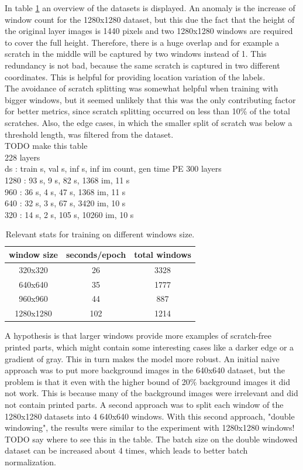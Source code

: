  In table \ref{win_size_training} an overview of the datasets is displayed. An anomaly is the increase of window count for the 1280x1280 dataset, but this due the fact that the height of the original layer images is 1440 pixels and two 1280x1280 windows are required to cover the full height. Therefore, there is a huge overlap and for example a scratch in the middle will be captured by two windows instead of 1. This redundancy is not bad, because the same scratch is captured in two different coordinates. This is helpful for providing location variation of the labels.  \\
The avoidance of scratch splitting was somewhat helpful when training with bigger windows, but it seemed unlikely that this was the only contributing factor for better metrics, since scratch splitting occurred on less than 10\% of the total scratches. Also, the edge cases, in which the smaller split of scratch was below a threshold length, was filtered from the dataset. \\

TODO make this table \\
228 layers \\
ds : train s, val s, inf s, inf im count, gen time PE 300 layers \\
1280 : 93 s, 9 s, 82 s, 1368 im, 11 s \\
960 : 36 s, 4 s, 47 s, 1368 im, 11 s \\
640 : 32 s, 3 s, 67 s, 3420 im, 10 s \\
320 : 14 s, 2 s, 105 s, 10260 im, 10 s \\

\begin{table}
\centering
\begin{tabular}{ ||c|c|c||}
\hline
window size & seconds/epoch & total windows\\ [0.5ex]
\hline\hline
320x320 & 26 & 3328 \\
640x640 & 35 & 1777 \\
960x960 & 44 & 887 \\
1280x1280 & 102 & 1214 \\
\hline
\end{tabular}
\label{win_size_training}
\caption{Relevant stats for training on different windows size.}
\end{table}

 A hypothesis is that larger windows provide more examples of scratch-free printed parts, which might contain some interesting cases like a darker edge or a gradient of gray. This in turn makes the model more robust. An initial naive approach was to put more background images in the 640x640 dataset, but the problem is that it even with the higher bound of 20\% background images it did not work. This is because many of the background images were irrelevant and did not contain printed parts. A second approach was to split each window of the 1280x1280 datasets into 4 640x640 windows. With this second approach, "double windowing", the results were similar to the experiment with 1280x1280 windows! TODO say where to see this in the table. The batch size on the double windowed dataset can be increased about 4 times, which leads to better batch normalization. \\

